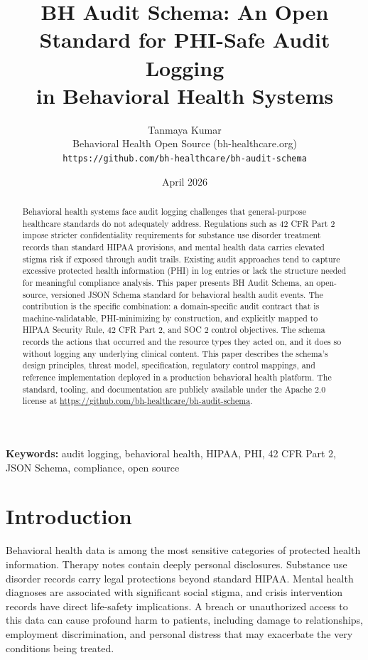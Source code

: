 \documentclass[11pt,a4paper]{article}
\title{BH Audit Schema: An Open Standard for PHI-Safe Audit Logging\\in Behavioral Health Systems}
\author{
    Tanmaya Kumar\\
    Behavioral Health Open Source (bh-healthcare.org)\\
    \texttt{https://github.com/bh-healthcare/bh-audit-schema}
}
\date{April 2026}
\begin{document}
\maketitle

\begin{abstract}
Behavioral health systems face audit logging challenges that general-purpose healthcare standards do not adequately address. Regulations such as 42 CFR Part 2 impose stricter confidentiality requirements for substance use disorder treatment records than standard HIPAA provisions, and mental health data carries elevated stigma risk if exposed through audit trails. Existing audit approaches tend to capture excessive protected health information (PHI) in log entries or lack the structure needed for meaningful compliance analysis. This paper presents BH Audit Schema, an open-source, versioned JSON Schema standard for behavioral health audit events. The contribution is the specific combination: a domain-specific audit contract that is machine-validatable, PHI-minimizing by construction, and explicitly mapped to HIPAA Security Rule, 42 CFR Part 2, and SOC 2 control objectives. The schema records the actions that occurred and the resource types they acted on, and it does so without logging any underlying clinical content. This paper describes the schema's design principles, threat model, specification, regulatory control mappings, and reference implementation deployed in a production behavioral health platform. The standard, tooling, and documentation are publicly available under the Apache 2.0 license at \url{https://github.com/bh-healthcare/bh-audit-schema}.
\end{abstract}

\noindent\textbf{Keywords:} audit logging, behavioral health, HIPAA, PHI, 42 CFR Part 2, JSON Schema, compliance, open source

\section{Introduction}

Behavioral health data is among the most sensitive categories of protected health information. Therapy notes contain deeply personal disclosures. Substance use disorder records carry legal protections beyond standard HIPAA. Mental health diagnoses are associated with significant social stigma, and crisis intervention records have direct life-safety implications. A breach or unauthorized access to this data can cause profound harm to patients, including damage to relationships, employment discrimination, and personal distress that may exacerbate the very conditions being treated.
\end{document}
